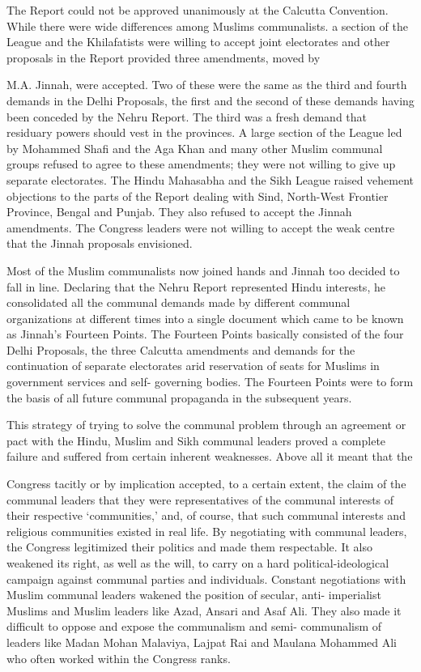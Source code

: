 The Report could not be approved unanimously at the Calcutta Convention. While there were wide differences among Muslims communalists. a section of the League and the Khilafatists were willing to accept joint electorates and other proposals in the Report provided three amendments, moved by 

M.A. Jinnah, were accepted. Two of these were the same as the third and fourth demands in the Delhi Proposals, the first and the second of these demands having been conceded by the Nehru Report. The third was a fresh demand that residuary powers should vest in the provinces. A large section of the League led by Mohammed Shafi and the Aga Khan and many other Muslim communal groups refused to agree to these amendments; they were not willing to give up separate electorates. The Hindu Mahasabha and the Sikh League raised vehement objections to the parts of the Report dealing with Sind, North-West Frontier Province, Bengal and Punjab. They also refused to accept the Jinnah amendments. The Congress leaders were not willing to accept the weak centre that the Jinnah proposals envisioned. 

Most of the Muslim communalists now joined hands and Jinnah too decided to fall in line. Declaring that the Nehru Report represented Hindu interests, he consolidated all the communal demands made by different communal organizations at different times into a single document which came to be known as Jinnah’s Fourteen Points. The Fourteen Points basically consisted of the four Delhi Proposals, the three Calcutta amendments and demands for the continuation of separate electorates arid reservation of seats for Muslims in government services and self- governing bodies. The Fourteen Points were to form the basis of all future communal propaganda in the subsequent years. 

This strategy of trying to solve the communal problem through an agreement or pact with the Hindu, Muslim and Sikh communal leaders proved a complete failure and suffered from certain inherent weaknesses. Above all it meant that the 

Congress tacitly or by implication accepted, to a certain extent, the claim of the communal leaders that they were representatives of the communal interests of their respective ‘communities,’ and, of course, that such communal interests and religious communities existed in real life. By negotiating with communal leaders, the Congress legitimized their politics and made them respectable. It also weakened its right, as well as the will, to carry on a hard political-ideological campaign against communal parties and individuals. Constant negotiations with Muslim communal leaders wakened the position of secular, anti- imperialist Muslims and Muslim leaders like Azad, Ansari and Asaf Ali. They also made it difficult to oppose and expose the communalism and semi- communalism of leaders like Madan Mohan Malaviya, Lajpat Rai and Maulana Mohammed Ali who often worked within the Congress ranks. 


